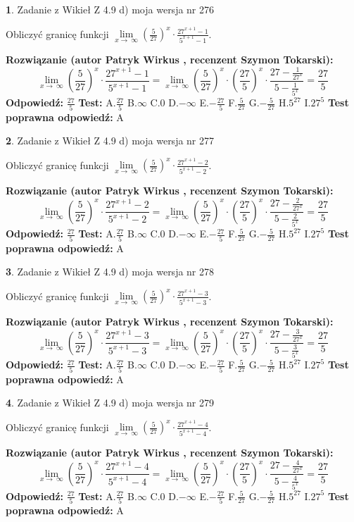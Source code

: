 \documentclass[12pt, a4paper]{article}
\theoremstyle{definition} %
\newtheorem{zad}{}
\newcommand{\zadStart}[1]{\begin{zad}#1\newline}
\newcommand{\zadStop}{\end{zad}}
\newcommand{\rozwStart}[2]{\noindent \textbf{Rozwiązanie (autor #1 , recenzent #2): }\newline}
\newcommand{\rozwStop}{\newline}
\newcommand{\odpStart}{\noindent \textbf{Odpowiedź:}\newline}
\newcommand{\odpStop}{\newline}
\newcommand{\testStart}{\noindent \textbf{Test:}\newline}
\newcommand{\testStop}{\newline}
\newcommand{\kluczStart}{\noindent \textbf{Test poprawna odpowiedź:}\newline}
\newcommand{\kluczStop}{\newline}
\begin{document}
\zadStart{Zadanie z Wikieł Z 4.9 d) moja wersja nr 276}


Obliczyć granicę funkcji  $\lim\limits_{x\to\ \infty}(\frac{5}{27})^{x}\cdot\frac{27^{x+1}-1}{5^{x+1}-1}$.
\zadStop
\rozwStart{Patryk Wirkus}{Szymon Tokarski}
$$\lim\limits_{x\to\ \infty}(\frac{5}{27})^{x}\cdot\frac{27^{x+1}-1}{5^{x+1}-1}=\lim\limits_{x\to\ \infty}(\frac{5}{27})^{x}\cdot(\frac{27}{5})^{x} \cdot \frac{27-\frac{1}{27^{x}}}{5-\frac{1}{5^{x}}} = \frac{27}{5}$$
\rozwStop
\odpStart
$\frac{27}{5}$
\odpStop
\testStart
A.$\frac{27}{5}$ B.$\infty$ C.$0$ D.$-\infty$ E.$-\frac{27}{5}$
F.$\frac{5}{27}$ G.$-\frac{5}{27}$
H.$5^{27}$
I.$27^{5}$
\testStop
\kluczStart
A
\kluczStop



\zadStart{Zadanie z Wikieł Z 4.9 d) moja wersja nr 277}


Obliczyć granicę funkcji  $\lim\limits_{x\to\ \infty}(\frac{5}{27})^{x}\cdot\frac{27^{x+1}-2}{5^{x+1}-2}$.
\zadStop
\rozwStart{Patryk Wirkus}{Szymon Tokarski}
$$\lim\limits_{x\to\ \infty}(\frac{5}{27})^{x}\cdot\frac{27^{x+1}-2}{5^{x+1}-2}=\lim\limits_{x\to\ \infty}(\frac{5}{27})^{x}\cdot(\frac{27}{5})^{x} \cdot \frac{27-\frac{2}{27^{x}}}{5-\frac{2}{5^{x}}} = \frac{27}{5}$$
\rozwStop
\odpStart
$\frac{27}{5}$
\odpStop
\testStart
A.$\frac{27}{5}$ B.$\infty$ C.$0$ D.$-\infty$ E.$-\frac{27}{5}$
F.$\frac{5}{27}$ G.$-\frac{5}{27}$
H.$5^{27}$
I.$27^{5}$
\testStop
\kluczStart
A
\kluczStop



\zadStart{Zadanie z Wikieł Z 4.9 d) moja wersja nr 278}


Obliczyć granicę funkcji  $\lim\limits_{x\to\ \infty}(\frac{5}{27})^{x}\cdot\frac{27^{x+1}-3}{5^{x+1}-3}$.
\zadStop
\rozwStart{Patryk Wirkus}{Szymon Tokarski}
$$\lim\limits_{x\to\ \infty}(\frac{5}{27})^{x}\cdot\frac{27^{x+1}-3}{5^{x+1}-3}=\lim\limits_{x\to\ \infty}(\frac{5}{27})^{x}\cdot(\frac{27}{5})^{x} \cdot \frac{27-\frac{3}{27^{x}}}{5-\frac{3}{5^{x}}} = \frac{27}{5}$$
\rozwStop
\odpStart
$\frac{27}{5}$
\odpStop
\testStart
A.$\frac{27}{5}$ B.$\infty$ C.$0$ D.$-\infty$ E.$-\frac{27}{5}$
F.$\frac{5}{27}$ G.$-\frac{5}{27}$
H.$5^{27}$
I.$27^{5}$
\testStop
\kluczStart
A
\kluczStop



\zadStart{Zadanie z Wikieł Z 4.9 d) moja wersja nr 279}


Obliczyć granicę funkcji  $\lim\limits_{x\to\ \infty}(\frac{5}{27})^{x}\cdot\frac{27^{x+1}-4}{5^{x+1}-4}$.
\zadStop
\rozwStart{Patryk Wirkus}{Szymon Tokarski}
$$\lim\limits_{x\to\ \infty}(\frac{5}{27})^{x}\cdot\frac{27^{x+1}-4}{5^{x+1}-4}=\lim\limits_{x\to\ \infty}(\frac{5}{27})^{x}\cdot(\frac{27}{5})^{x} \cdot \frac{27-\frac{4}{27^{x}}}{5-\frac{4}{5^{x}}} = \frac{27}{5}$$
\rozwStop
\odpStart
$\frac{27}{5}$
\odpStop
\testStart
A.$\frac{27}{5}$ B.$\infty$ C.$0$ D.$-\infty$ E.$-\frac{27}{5}$
F.$\frac{5}{27}$ G.$-\frac{5}{27}$
H.$5^{27}$
I.$27^{5}$
\testStop
\kluczStart
A
\kluczStop
\end{document}
